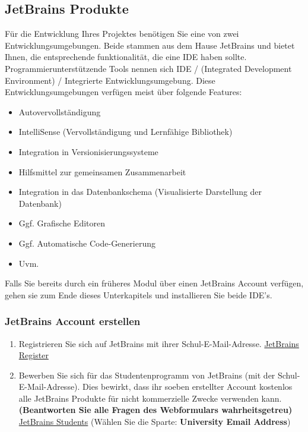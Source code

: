 \subsection{JetBrains Produkte}\label{subsec:jetbrains}
\begin{frame}[fragile]
    Für die Entwicklung Ihres Projektes benötigen Sie eine von zwei Entwicklungsumgebungen.
    Beide stammen aus dem Hause JetBrains und bietet Ihnen, die entsprechende funktionalität, die eine IDE haben sollte.
    Programmierunterstützende Tools nennen sich IDE / (Integrated Development Environment) /
    Integrierte Entwicklungsumgebung.
    Diese Entwicklungsumgebungen verfügen meist über folgende Features:
    \begin{itemize}
        \item Autovervollständigung
        \item IntelliSense (Vervollständigung und Lernfähige Bibliothek)
        \item Integration in Versionisierungssysteme
        \item Hilfsmittel zur gemeinsamen Zusammenarbeit
        \item Integration in das Datenbankschema (Visualisierte Darstellung der Datenbank)
        \item Ggf. Grafische Editoren
        \item Ggf. Automatische Code-Generierung
        \item Uvm.
    \end{itemize}
    Falls Sie bereits durch ein früheres Modul über einen JetBrains Account verfügen, gehen sie zum Ende dieses
    Unterkapitels und installieren Sie beide IDE's.
\end{frame}

\subsubsection{JetBrains Account erstellen}\label{subsubsec:jetbrainsAccount}
\begin{frame}[fragile]
    \begin{enumerate}
        \item Registrieren Sie sich auf JetBrains mit ihrer Schul-E-Mail-Adresse.
        \href{https://account.jetbrains.com/login}{JetBrains Register}
        \item Bewerben Sie sich für das Studentenprogramm von JetBrains (mit der Schul-E-Mail-Adresse).
        Dies bewirkt, dass ihr soeben erstellter Account kostenlos alle JetBrains Produkte für nicht kommerzielle Zwecke verwenden kann.
        \textbf{(Beantworten Sie alle Fragen des Webformulars wahrheitsgetreu)}
        \href{https://www.jetbrains.com/shop/eform/students}{JetBrains Students}
        (Wählen Sie die Sparte: \textbf{University Email Address})
    \end{enumerate}
\end{frame}

